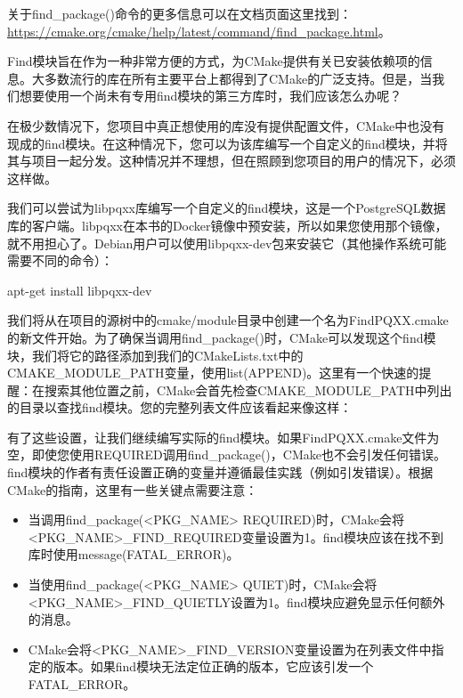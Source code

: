 关于find\_package()命令的更多信息可以在文档页面这里找到：\url{https://cmake.org/cmake/help/latest/command/find_package.html}。

Find模块旨在作为一种非常方便的方式，为CMake提供有关已安装依赖项的信息。大多数流行的库在所有主要平台上都得到了CMake的广泛支持。但是，当我们想要使用一个尚未有专用find模块的第三方库时，我们应该怎么办呢？


在极少数情况下，您项目中真正想使用的库没有提供配置文件，CMake中也没有现成的find模块。在这种情况下，您可以为该库编写一个自定义的find模块，并将其与项目一起分发。这种情况并不理想，但在照顾到您项目的用户的情况下，必须这样做。

我们可以尝试为libpqxx库编写一个自定义的find模块，这是一个PostgreSQL数据库的客户端。libpqxx在本书的Docker镜像中预安装，所以如果您使用那个镜像，就不用担心了。Debian用户可以使用libpqxx-dev包来安装它（其他操作系统可能需要不同的命令）：

\begin{shell}
apt-get install libpqxx-dev
\end{shell}

我们将从在项目的源树中的cmake/module目录中创建一个名为FindPQXX.cmake的新文件开始。为了确保当调用find\_package()时，CMake可以发现这个find模块，我们将它的路径添加到我们的CMakeLists.txt中的CMAKE\_MODULE\_PATH变量，使用list(APPEND)。这里有一个快速的提醒：在搜索其他位置之前，CMake会首先检查CMAKE\_MODULE\_PATH中列出的目录以查找find模块。您的完整列表文件应该看起来像这样：



有了这些设置，让我们继续编写实际的find模块。如果FindPQXX.cmake文件为空，即使您使用REQUIRED调用find\_package()，CMake也不会引发任何错误。find模块的作者有责任设置正确的变量并遵循最佳实践（例如引发错误）。根据CMake的指南，这里有一些关键点需要注意：

\begin{itemize}
\item
当调用find\_package(<PKG\_NAME> REQUIRED)时，CMake会将<PKG\_NAME>\_FIND\_REQUIRED变量设置为1。find模块应该在找不到库时使用message(FATAL\_ERROR)。

\item
当使用find\_package(<PKG\_NAME> QUIET)时，CMake会将<PKG\_NAME>\_FIND\_QUIETLY设置为1。find模块应避免显示任何额外的消息。

\item
CMake会将<PKG\_NAME>\_FIND\_VERSION变量设置为在列表文件中指定的版本。如果find模块无法定位正确的版本，它应该引发一个FATAL\_ERROR。
\end{itemize}

